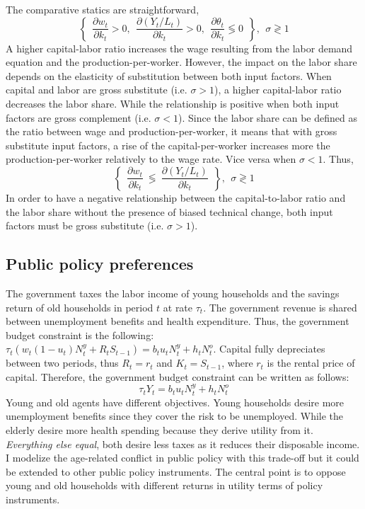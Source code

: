 The comparative statics are straightforward,
	\begin{equation*}
		\left\lbrace ~~
		\frac{\partial w_t}{\partial k_t} > 0,~~
		\frac{\partial (Y_t/L_t)}{\partial k_t} > 0,~~
		\frac{\partial \theta_t}{\partial k_t} \lessgtr 0 ~~
		\right\rbrace, ~~ \sigma \gtrless 1
	\end{equation*}
A higher capital-labor ratio increases the wage resulting from the labor demand equation and the production-per-worker. However, the impact on the labor share depends on the elasticity of substitution between both input factors. When capital and labor are gross substitute (i.e. $\sigma > 1$), a higher capital-labor ratio decreases the labor share. While the relationship is positive when both input factors are gross complement (i.e. $\sigma < 1$). Since the labor share can be defined as the ratio between wage and production-per-worker, it means that with gross substitute input factors, a rise of the capital-per-worker increases more the production-per-worker relatively to the wage rate. Vice versa when $\sigma <1$. Thus,
	\begin{equation*}
		\left\lbrace ~~
		\frac{\partial w_t}{\partial k_t} ~\lessgtr~ \frac{\partial (Y_t/L_t)}{\partial k_t} ~~
		\right\rbrace, ~~ \sigma \gtrless 1
	\end{equation*}
In order to have a negative relationship between the capital-to-labor ratio and the labor share without the presence of biased technical change, both input factors must be gross substitute (i.e. $\sigma >1$).

\subsection{Public policy preferences}\label{subsec:public_policy_preferences}

The government taxes the labor income of young households and the savings return of old households in period $t$ at rate $\tau_t$. The government revenue is shared between unemployment benefits and health expenditure. Thus, the government budget constraint is the following: $\tau_t\left( w_t(1-u_t)N^y_t + R_t S_{t-1} \right) = b_t u_t N^y_t + h_t N^o_t$. Capital fully depreciates between two periods, thus  $R_t = r_t$ and $K_t = S_{t-1}$, where $r_t$ is the rental price of capital. Therefore, the government budget constraint can be written as follows:
	\begin{equation} \label{eq:government_bc}
		\tau_t Y_t = b_t u_t N^y_t + h_t N^o_t
	\end{equation}
Young and old agents have different objectives. Young households desire more unemployment benefits since they cover the risk to be unemployed. While the elderly desire more health spending because they derive utility from it. \textit{Everything else equal}, both desire less taxes as it reduces their disposable income. I modelize the age-related conflict in public policy with this trade-off but it could be extended to other public policy instruments. The central point is to oppose young and old households with different returns in utility terms of policy instruments.

